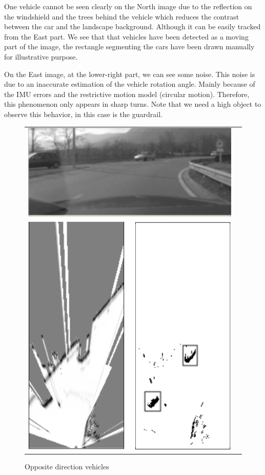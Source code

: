 One vehicle cannot be seen clearly on the North image due to the reflection on the windshield and the trees behind the vehicle which reduces the contrast between the car and the landscape background. Although it can be easily tracked from the East part. We see that that vehicles have been detected as a moving part of the image, the rectangle segmenting the cars have been drawn manually for illustrative purpose. 

On the East image, at the lower-right part, we can see some noise. This noise is due to an inaccurate estimation of the vehicle rotation angle. Mainly because of the IMU errors and the restrictive motion model (circular motion). Therefore, this phenomenon only appears in sharp turns. Note that we need a high object to observe this behavior, in this case is the guardrail.

\begin{figure}[H]
   \centering
     \begin{tabular}{lr}
       \includegraphics[scale=0.60]{img/fig:result:scenetwocars}
     \end{tabular}
   \caption{Opposite direction vehicles}
   \label{fig:result:scenetwocars}
\end{figure}

